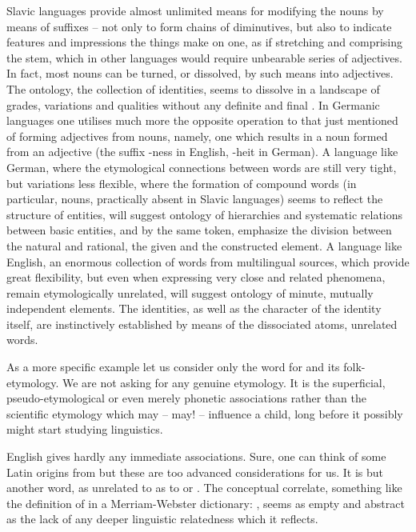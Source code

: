 \pa Slavic languages provide almost unlimited means for modifying the nouns by
means of suffixes -- not only to form chains of diminutives, but also to
indicate features and impressions the things make on one, as if stretching and
comprising the stem, which in other languages would require unbearable series of
adjectives. In
fact, most nouns can be turned, or dissolved, by such means into adjectives. The
ontology, the collection of identities, seems to dissolve in a landscape of
grades, variations and qualities without any definite and final
.  In Germanic languages one utilises much more the opposite
operation to that just mentioned of forming adjectives from nouns, namely, one
which results in a noun formed from an adjective (the suffix -ness in English,
-heit in German).  A language like German, where the etymological connections
between words are still very tight, but variations less flexible, where the
formation of compound words (in particular, nouns, practically absent in Slavic
languages) seems to reflect the structure of entities, will suggest ontology of
hierarchies and systematic relations between basic entities, and by the same
token, emphasize the division between the natural and rational, the given and
the constructed element.  A language like English, an enormous collection of
words from multilingual sources, which provide great flexibility, but even when
expressing very close and related phenomena, remain etymologically unrelated,
will suggest ontology of minute, mutually independent elements. The
identities, as well as the character of the identity itself, are instinctively
established by means of the dissociated atoms, unrelated words.

As a more specific example let us consider only the word for  and its
folk-etymology. We are not asking for any genuine etymology. It is the
superficial, pseudo-etymological or even merely phonetic associations rather
than the scientific etymology which may -- may!  -- influence a child, long
before it possibly might start studying linguistics.

English  gives hardly any immediate associations.  Sure, one can
think of some Latin origins from  but these are too advanced
considerations for us. It is but another word, as unrelated to  as to
 or .  The conceptual correlate, something like
the definition of  in a Merriam-Webster dictionary: , seems as empty and
abstract as the lack of any deeper linguistic relatedness which it reflects.


